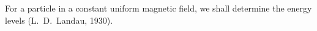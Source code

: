 For a particle in a constant uniform magnetic field, we shall determine the energy levels (L.~D.~Landau, 1930).

